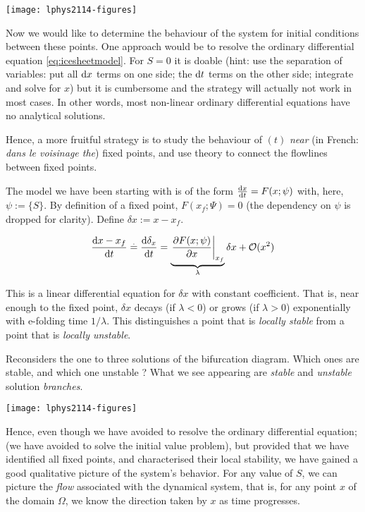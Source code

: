 \texttt{[image: lphys2114-figures]}

Now we would like to determine the behaviour of the system for initial
conditions between these points. One approach would be to resolve the
ordinary differential equation \eqref{eq:icesheetmodel}. For \(S=0\) it
is doable (hint: use the separation of variables: put all \(\mathop{}\!\mathrm{d} x\)
terms on one side; the \(\mathop{}\!\mathrm{d} t\) terms on the other side; integrate and
solve for \(x\)) but it is cumbersome and the strategy will actually not
work in most cases. In other words, most non-linear ordinary
differential equations have no analytical solutions.

Hence, a more fruitful strategy is to study the behaviour of \((t)\)
\emph{near} (in French: \emph{dans le voisinage the}) fixed points, and
use theory to connect the flowlines between fixed points.

The model we have been starting with is of the form
\(\ddt x = F (x;\psi)\) with, here, \(\psi := \{S\}\). By definition of
a fixed point, \(F(x_f;\Psi)=0\) (the dependency on \(\psi\) is dropped
for clarity). Define \(\delta x := x-x_f\).

\begin{equation}
\ddt {x-x_f} \eqbdef \ddt {\delta_x} = \underbrace {\left.\pd{F(x;\psi)}{x}\right|_{x_f}}_{\lambda}  \delta x + \mathcal{O}(x^2)
\end{equation}

This is a linear differential equation for \(\delta x\) with constant
coefficient. That is, near enough to the fixed point, \(\delta x\)
decays (if \(\lambda < 0\)) or grows (if \(\lambda > 0\)) exponentially
with e-folding time \(1/\lambda\). This distinguishes a point that is
\emph{locally stable} from a point that is \emph{locally unstable}.

\bcd
Reconsiders the one to three solutions of the bifurcation diagram. Which
ones are stable, and which one unstable ? What we see appearing are
\emph{stable} and \emph{unstable} solution \emph{branches}. \ecd 

\texttt{[image: lphys2114-figures]}

Hence, even though we have avoided to resolve the ordinary differential
equation; (we have avoided to solve the initial value problem), but
provided that we have identified all fixed points, and characterised
their local stability, we have gained a good qualitative picture of the
system's behavior. For any value of \(S\), we can picture the
\emph{flow} associated with the dynamical system, that is, for any point
\(x\) of the domain \(\Omega\), we know the direction taken by \(x\) as
time progresses.

